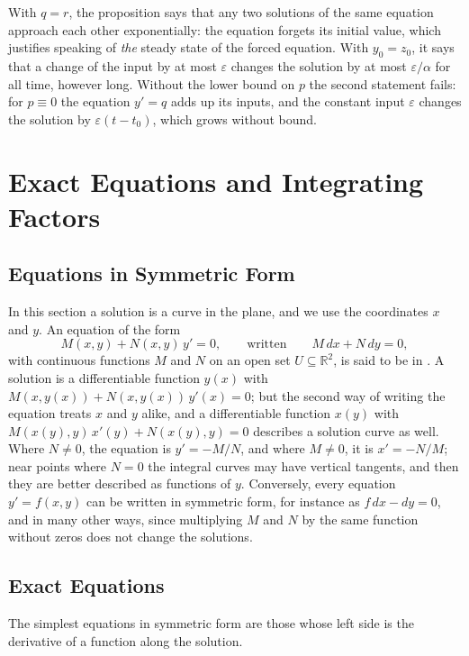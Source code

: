With $q=r$, the proposition says that any two solutions of the same equation approach each other exponentially: the equation forgets its initial value, which justifies speaking of \emph{the} steady state of the forced equation. With $y_0=z_0$, it says that a change of the input by at most $\varepsilon$ changes the solution by at most $\varepsilon/\alpha$ for all time, however long. Without the lower bound on $p$ the second statement fails: for $p\equiv0$ the equation $y'=q$ adds up its inputs, and the constant input $\varepsilon$ changes the solution by $\varepsilon(t-t_0)$, which grows without bound.

\section{Exact Equations and Integrating Factors}
\label{sec:exact}

\subsection{Equations in Symmetric Form}

In this section a solution is a curve in the plane, and we use the coordinates $x$ and $y$. An equation of the form
\begin{equation}
M(x,y)+N(x,y)\,y'=0,\qquad\text{written}\qquad M\,dx+N\,dy=0 ,
\label{eq:symmetric-form}
\end{equation}
with continuous functions $M$ and $N$ on an open set $U\subseteq\mathbb R^2$, is said to be in . A solution is a differentiable function $y(x)$ with $M(x,y(x))+N(x,y(x))\,y'(x)=0$; but the second way of writing the equation treats $x$ and $y$ alike, and a differentiable function $x(y)$ with $M(x(y),y)\,x'(y)+N(x(y),y)=0$ describes a solution curve as well. Where $N\ne0$, the equation is $y'=-M/N$, and where $M\ne0$, it is $x'=-N/M$; near points where $N=0$ the integral curves may have vertical tangents, and then they are better described as functions of $y$. Conversely, every equation $y'=f(x,y)$ can be written in symmetric form, for instance as $f\,dx-dy=0$, and in many other ways, since multiplying $M$ and $N$ by the same function without zeros does not change the solutions.

\subsection{Exact Equations}

The simplest equations in symmetric form are those whose left side is the derivative of a function along the solution.

